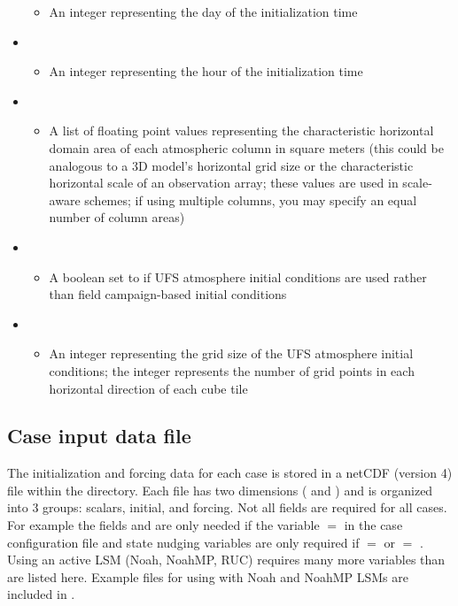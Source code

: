 \begin{itemize}
	\begin{itemize}
	\item An integer representing the day of the initialization time
	\end{itemize}
\item {}
	\begin{itemize}
	\item An integer representing the hour of the initialization time
	\end{itemize}
\item {}
	\begin{itemize}
	\item A list of floating point values representing the characteristic horizontal domain area of each atmospheric column in square meters (this could be analogous to a 3D model's horizontal grid size or the characteristic horizontal scale of an observation array; these values are used in scale-aware schemes; if using multiple columns, you may specify an equal number of column areas)
	\end{itemize}
\item {}
	\begin{itemize}
	\item A boolean set to  if UFS atmosphere initial conditions are used rather than field campaign-based initial conditions
	\end{itemize}
\item {}
	\begin{itemize}
	\item An integer representing the grid size of the UFS atmosphere initial conditions; the integer represents the number of grid points in each horizontal direction of each cube tile
	\end{itemize}
\end{itemize}

\subsection{Case input data file}
\label{subsection: case input}

The initialization and forcing data for each case is stored in a netCDF (version 4) file within the  directory. Each file has two dimensions ( and ) and is organized into 3 groups: scalars, initial, and forcing. Not all fields are required for all cases. For example the fields  and  are only needed if the variable  $=$  in the case configuration file and state nudging variables are only required if  $=$  or  $=$ . Using an active LSM (Noah, NoahMP, RUC) requires many more variables than are listed here. Example files for using with Noah and NoahMP LSMs are included in .

